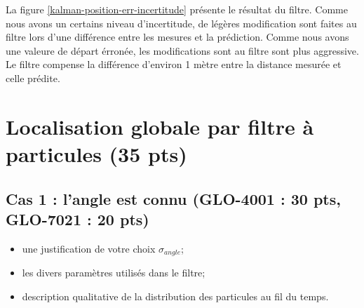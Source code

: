 \documentclass[12pt]{article}
\begin{document}
La figure \ref{kalman-position-err-incertitude} présente le résultat du filtre.
Comme nous avons un certains niveau d'incertitude, de légères modification sont faites au filtre lors d'une différence entre les mesures et la prédiction.
Comme nous avons une valeure de départ érronée, les modifications sont au filtre sont plus aggressive.
Le filtre compense la différence d'environ 1 mètre entre la distance  mesurée et celle prédite.


\section {Localisation globale par filtre à particules (35 pts)}

\subsection{Cas 1 : l'angle est connu (GLO-4001 : 30 pts, GLO-7021 : 20 pts)}

\begin{itemize}
\item une justification de votre choix $\sigma_{angle}$;
\item les divers paramètres utilisés dans le filtre;
\item description qualitative de la distribution des particules au fil du temps.
\end{itemize}
\end{document}
